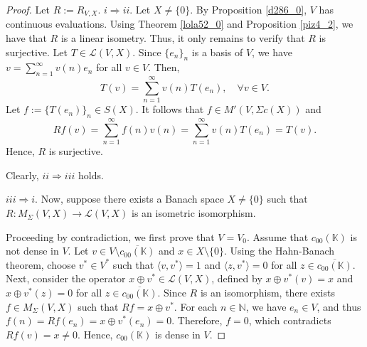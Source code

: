 \documentclass[14pt, a4paper]{article}  %
\newcommand{\K}{\mathbb{K}}
\newcommand{\N}{\mathbb{N}}
\newcommand{\Mt}{M'}
\begin{document}
\begin{proof} Let $R := R_{V,X}$.
	$i \Longrightarrow ii$. Let $X \neq \{0\}$. By Proposition \ref{d286_0}, $V$ has continuous evaluations. Using Theorem \ref{lola52_0} and Proposition \ref{piz4_2}, we have that $R$ is a linear isometry. Thus, it only remains to verify that $R$ is surjective. Let $T \in \mathcal{L}(V, X)$. Since $\{e_{n}\}_{n}$ is a basis of $V$, we have $v = \sum_{n=1}^{\infty} v(n) e_{n}$ for all $v \in V$. Then, 
	\begin{equation}
			T(v) = \sum_{n=1}^{\infty} v(n) T(e_{n}), \quad \forall v \in V.
	\end{equation}
	Let $f := \{T(e_{n})\}_{n} \in S(X)$. It follows that $f \in \Mt(V, \Sigma c(X))$ and 
	\begin{equation}
		Rf(v) = \sum_{n=1}^{\infty} f(n) v(n) = \sum_{n=1}^{\infty} v(n) T(e_{n}) = T(v).
	\end{equation}
	Hence, $R$ is surjective.
	
	 Clearly, $ii \Longrightarrow iii$ holds.
	
	
	$iii \Longrightarrow i$. Now, suppose there exists a Banach space $X \neq \{0\}$ such that $R: M_{\Sigma}(V, X) \to \mathcal{L}(V, X)$ is an isometric isomorphism. 
	
Proceeding by contradiction, we first prove that $V = V_{0}$. Assume that $c_{00}(\K)$ is not dense in $V$. Let $v \in V \setminus \overline{c_{00}(\K)}$ and $x \in X \setminus \{0\}$. Using the Hahn-Banach theorem, choose $v^{*} \in V^{*}$ such that $\langle v, v^{*} \rangle = 1$ and $\langle z, v^{*} \rangle = 0$ for all $z \in \overline{c_{00}(\K)}$. Next, consider the operator $x \oplus v^{*} \in \mathcal{L}(V, X)$, defined by  $x \oplus v^{*}(v) = x$ and $x \oplus v^{*}(z) = 0$ for all $z \in \overline{c_{00}(\K)}$. Since $R$ is an isomorphism, there exists $f \in M_{\Sigma}(V, X)$ such that $Rf = x \oplus v^{*}$. For each $n \in \N$, we have $e_{n} \in V$, and thus 
	$
	f(n) = Rf(e_{n}) = x \oplus v^{*}(e_{n}) = 0.
	$
	Therefore, $f = 0$, which contradicts $Rf(v) = x \neq 0$. Hence, $c_{00}(\K)$ is dense in $V$.
	

\end{proof}
\end{document}
